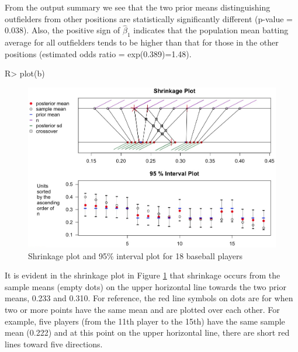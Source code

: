 \documentclass[article]{jss}
\begin{document}
From the output summary we see that the two prior means distinguishing outfielders from other positions are statistically significantly different (p-value = 0.038). Also, the positive sign of $\hat{\beta}_{1}$ indicates that the population mean batting average for all outfielders tends to be higher than that for those in the other positions (estimated odds ratio = exp(0.389)=1.48).

\begin{CodeChunk}
\begin{CodeInput}
R> plot(b)
\end{CodeInput}
\end{CodeChunk}
\begin{figure}[h]
\begin{center}
\includegraphics[width = 6in]{baseball1.png}
\caption{Shrinkage plot and 95\% interval plot for 18 baseball players}
\label{fig:baseball}
\end{center}
\end{figure}

It is evident in the shrinkage plot in Figure \ref{fig:baseball} that shrinkage occurs from the sample means (empty dots) on the upper horizontal line towards the two prior means, 0.233 and 0.310. For reference, the red line symbols on dots are for when two or more points have the same mean and are plotted over each other. For example, five players (from the 11th player to the 15th) have the same sample mean (0.222) and at this point on the upper horizontal line, there are short red lines toward five directions.

\end{document}
